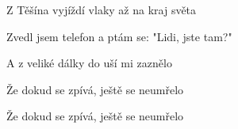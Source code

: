 \begin{song}
\bigskip

Z Těšína vyjíždí vlaky až na kraj světa    \par
{}Zvedl jsem telefon a ptám se: "Lidi, jste tam?"    \par
A z veliké dálky do uší mi zaznělo \par
Že dokud se zpívá, ještě se neumřelo    \par
Že dokud se zpívá, ještě se neumřelo \par

\end{song}
